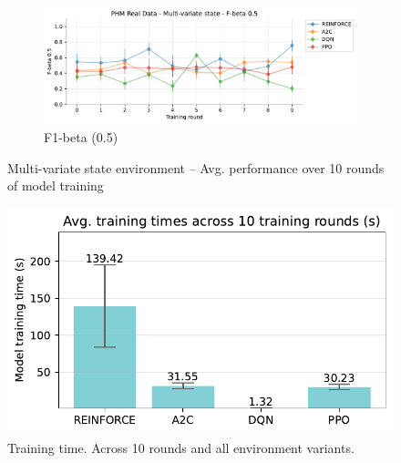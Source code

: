 \documentclass[a4paper, 12pt]{article}
\begin{document}
\begin{figure}[ht]
	\begin{subfigure}{\textwidth}
		\centering
		\includegraphics[width=\linewidth]{Multivariate_F05.pdf}  
		\caption{F1-beta (0.5)}
		\label{fig:tr-ms-f05}
	\end{subfigure}
	\caption{Multi-variate state environment -- Avg. performance over 10 rounds of model training}
	\label{fig:tr-ms-env}
\end{figure}

\begin{figure}[ht]
	\centering
	\includegraphics[width=\linewidth]{Model_training_time.pdf}  
	\caption{Training time. Across 10 rounds and all environment variants.}
	\label{fig:tr-time}
\end{figure}
\end{document}
